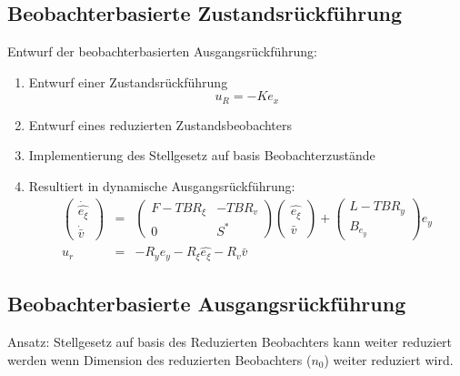 \subsection{Beobachterbasierte Zustandsrückführung}
Entwurf der beobachterbasierten Ausgangsrückführung:
\begin{enumerate}
    \item Entwurf einer Zustandsrückführung
        \begin{equation}
            u_R = -K e_x
        \end{equation}
    \item Entwurf eines reduzierten Zustandsbeobachters
    \item Implementierung des Stellgesetz auf basis Beobachterzustände
    \item Resultiert in dynamische Ausgangsrückführung:
        \begin{eqnarray}
            \begin{pmatrix}
                \dot{\hat{e_\xi}} \\ \dot{\bar{v}}
            \end{pmatrix}
            &=&
            \begin{pmatrix}
                F - TBR_\xi & - T B R_v \\
                0 & S^*
            \end{pmatrix}
            \begin{pmatrix}
                \hat{e_\xi} \\ \bar{v}
            \end{pmatrix}
            +
            \begin{pmatrix}
                L-TBR_y \\ B_{e_y}
            \end{pmatrix}
            e_y \\
            u_r &=& -R_y e_y - R_\xi \hat{e_\xi} - R_v \bar{v}
        \end{eqnarray}
\end{enumerate}

\subsection{Beobachterbasierte Ausgangsrückführung}
Ansatz: Stellgesetz auf basis des Reduzierten Beobachters kann weiter
reduziert werden wenn Dimension des reduzierten Beobachters ($n_0$) weiter reduziert wird.

